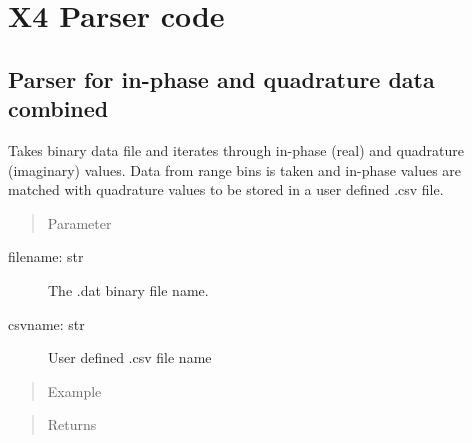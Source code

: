 \documentclass[letterpaper,10pt,english]{sphinxmanual}
\begin{document}
\section{X4 Parser code}
\label{\detokenize{X4 parser::doc}}\label{\detokenize{X4 parser:x4-parser-code}}

\subsection{Parser for in-phase and quadrature data combined}
\label{\detokenize{X4 parser:module-X4_parser}}\label{\detokenize{X4 parser:parser-for-in-phase-and-quadrature-data-combined}}

\begin{fulllineitems}
\label{\detokenize{X4 parser:X4_parser.iq_data}}
Takes binary data file and iterates through in-phase (real) and quadrature (imaginary) values.
Data from range bins is taken and in-phase values are matched with quadrature values to be stored in a user defined .csv file.
\begin{quote}\begin{description}
\item[{Parameter}] \leavevmode
\end{description}\end{quote}
\begin{description}
\item[{filename: str}] \leavevmode
The .dat binary file name.

\item[{csvname: str}] \leavevmode
User defined .csv file name

\end{description}
\begin{quote}\begin{description}
\item[{Example}] \leavevmode
\end{description}\end{quote}

%
\begin{sphinxVerbatim}[commandchars=\\\{\}]
\end{sphinxVerbatim}
\begin{quote}\begin{description}
\item[{Returns}] \leavevmode



\end{description}
\end{quote}
\end{fulllineitems}
\end{document}
